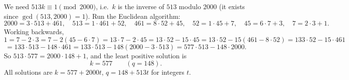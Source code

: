 We need $513k\equiv1\pmod{2000}$, i.e.\ $k$ is the inverse of $513$ modulo $2000$ (it exists since $\gcd(513,2000)=1$). Run the Euclidean algorithm:
\[
2000=3\cdot513+461,\quad 513=1\cdot461+52,\quad 461=8\cdot52+45,\quad 52=1\cdot45+7,\quad 45=6\cdot7+3,\quad 7=2\cdot3+1 .
\]
Working backwards,
\[
1=7-2\cdot3=7-2(45-6\cdot7)=13\cdot7-2\cdot45=13\cdot52-15\cdot45=13\cdot52-15(461-8\cdot52)=133\cdot52-15\cdot461
\]
\[
=133\cdot513-148\cdot461=133\cdot513-148(2000-3\cdot513)=577\cdot513-148\cdot2000 .
\]
So $513\cdot577=2000\cdot148+1$, and the least positive solution is
\[
k=\boxed{577}\qquad(q=148).
\]
All solutions are $k=577+2000t$, $q=148+513t$ for integers $t$.
